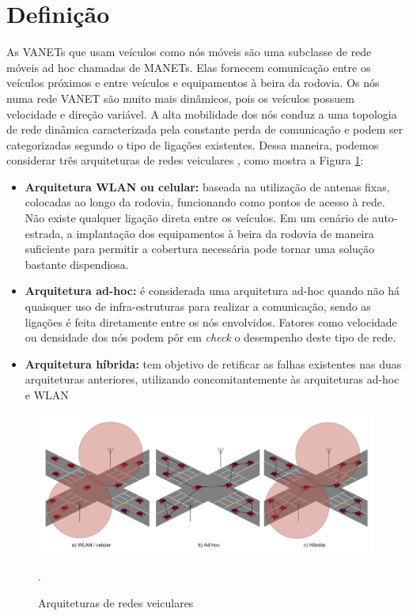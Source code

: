 \documentclass[
	12pt,				%
	oneside,			%
	a4paper,			%
	english,			%
	brazil				%
	]{abntex2ppgsi}
\begin{document}
\section{Definição}

As VANETs que usam veículos como nós móveis são uma subclasse de rede móveis ad hoc chamadas de MANETs. Elas fornecem comunicação entre os veículos próximos e entre veículos e equipamentos à beira da rodovia. Os nós numa rede VANET são muito mais dinâmicos, pois os veículos possuem velocidade e direção variável. A alta mobilidade dos nós conduz a uma topologia de rede dinâmica caracterizada pela constante perda de comunicação \cite{bubenikova2014security} \cite{jakubiak2008state} e podem ser categorizadas segundo o tipo de ligações existentes. Dessa maneira, podemos considerar três arquiteturas de redes veiculares \cite{luis2009melhoria}, como mostra a Figura \ref{fig:arquiteturas_vanets}: 


\begin{itemize}
	\item{\textbf{Arquitetura WLAN ou celular:} baseada na utilização de antenas fixas, colocadas ao longo da rodovia, funcionando como pontos de acesso à rede. Não existe qualquer ligação direta entre os veículos. Em um cenário de auto-estrada, a implantação dos equipamentos à beira da rodovia de maneira suficiente para permitir a cobertura necessária pode tornar uma solução bastante dispendiosa.}	
	\item{\textbf{Arquitetura ad-hoc:} é considerada uma arquitetura ad-hoc quando não há quaisquer uso de infra-estruturas para realizar a comunicação, sendo as ligações é feita diretamente entre os nós envolvidos. Fatores como velocidade ou densidade dos nós podem pôr em \textit{check} o desempenho deste tipo de rede.}	
	\item{\textbf{Arquitetura híbrida: } tem objetivo de retificar as falhas existentes nas duas arquiteturas anteriores, utilizando concomitantemente às arquiteturas ad-hoc e WLAN}	
\end{itemize} 


\begin{figure}[h!]
	\centering
	\includegraphics[width=0.8\columnwidth]{images/tipos_arquiteturas_vanets}
	\caption{Arquiteturas de redes veiculares\cite{luis2009melhoria}}.
	\label{fig:arquiteturas_vanets}
\end{figure}
\end{document}
